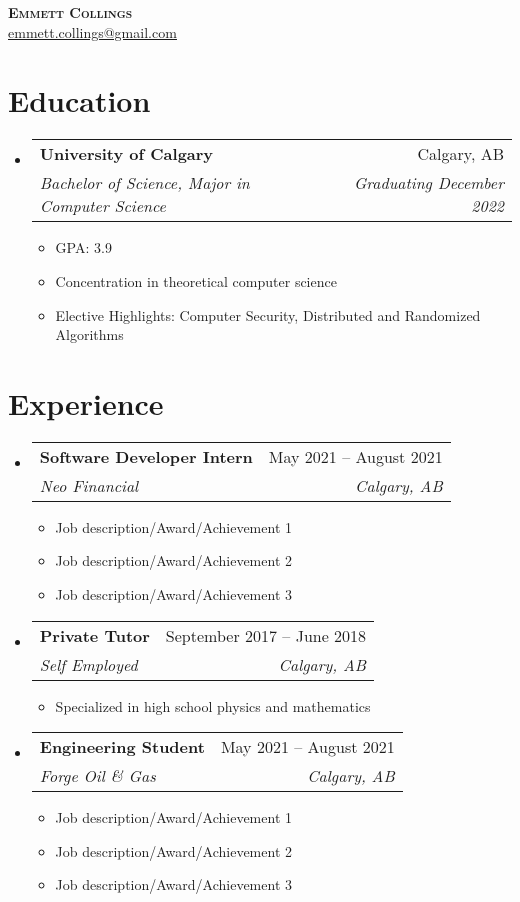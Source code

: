 \documentclass[letterpaper,11pt]{article}
\makeatletter
\newcommand{\resumeItem}[1]{
  \item\small{
    {#1 \vspace{-2pt}}
  }
}
\newcommand{\resumeSubheading}[4]{
  \vspace{-2pt}\item
    \begin{tabular*}{0.97\textwidth}[t]{l@{\extracolsep{\fill}}r}
      \textbf{#1} & #2 \\
      \textit{\small#3} & \textit{\small #4} \\
    \end{tabular*}\vspace{-7pt}
}
\newcommand{\resumeSubHeadingListStart}{\begin{itemize}[leftmargin=0.15in, label={}]}
\newcommand{\resumeSubHeadingListEnd}{\end{itemize}}
\newcommand{\resumeItemListStart}{\begin{itemize}}
\newcommand{\resumeItemListEnd}{\end{itemize}\vspace{-5pt}}
\makeatother
\begin{document}

\begin{center}
  \textbf{\Huge \scshape Emmett Collings} \\ \vspace{1pt}
  \href{mailto:emmett.collings@gmail.com}{\underline{emmett.collings@gmail.com}}
\end{center}


\section{Education}
\resumeSubHeadingListStart
\resumeSubheading
{University of Calgary}{Calgary, AB}
{Bachelor of Science, Major in Computer Science}{Graduating December 2022}
\resumeItemListStart
\resumeItem{GPA: 3.9}
\resumeItem{Concentration in theoretical computer science}
\resumeItem{Elective Highlights: Computer Security, Distributed and Randomized Algorithms}

\resumeItemListEnd

\resumeSubHeadingListEnd

\section{Experience}
\resumeSubHeadingListStart

\resumeSubheading
{Software Developer Intern}{May 2021 – August 2021}
{Neo Financial}{Calgary, AB}
\resumeItemListStart
\resumeItem{Job description/Award/Achievement 1}
\resumeItem{Job description/Award/Achievement 2}
\resumeItem{Job description/Award/Achievement 3}
\resumeItemListEnd

\resumeSubheading
{Private Tutor}{September 2017 – June 2018}
{Self Employed}{Calgary, AB}
\resumeItemListStart
\resumeItem{Specialized in high school physics and mathematics}
\resumeItemListEnd

\resumeSubheading
{Engineering Student}{May 2021 – August 2021}
{Forge Oil \& Gas}{Calgary, AB}
\resumeItemListStart
\resumeItem{Job description/Award/Achievement 1}
\resumeItem{Job description/Award/Achievement 2}
\resumeItem{Job description/Award/Achievement 3}
\resumeItemListEnd


\resumeSubHeadingListEnd
\end{document}
